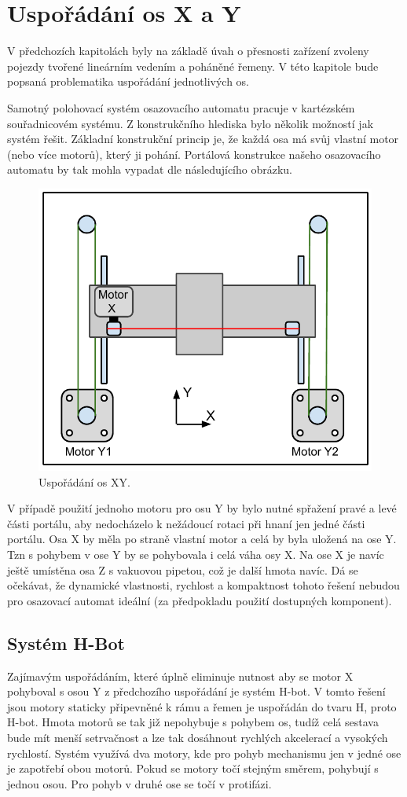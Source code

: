 \section{Uspořádání os X a Y}

V předchozích kapitolách byly na základě úvah o přesnosti zařízení zvoleny pojezdy tvořené lineárním vedením a poháněné řemeny. V této kapitole bude popsaná problematika uspořádání jednotlivých os.

Samotný polohovací systém osazovacího automatu pracuje v kartézském souřadnicovém systému.  Z konstrukčního hlediska bylo několik možností jak systém řešit. Základní konstrukční princip je, že každá osa má svůj vlastní motor (nebo více motorů), který ji pohání. Portálová konstrukce našeho osazovacího automatu by tak mohla vypadat dle následujícího obrázku.

\begin{figure}[H]
  \centering
    \includegraphics[width=0.6\linewidth]{pdf/XY2.pdf}%
    \caption{Uspořádání os XY.}
    \label{fig:XY}
\end{figure}


V případě použití jednoho motoru pro osu Y by bylo nutné spřažení pravé a levé části portálu, aby nedocházelo k nežádoucí rotaci při hnaní jen jedné části portálu. Osa X by měla po straně vlastní motor a celá by byla uložená na ose Y. Tzn s pohybem v ose Y by se pohybovala i celá váha osy X. Na ose X je navíc ještě umístěna osa Z s vakuovou pipetou, což je další hmota navíc. Dá se očekávat, že dynamické vlastnosti, rychlost a kompaktnost tohoto řešení nebudou pro osazovací automat ideální (za předpokladu použití dostupných komponent).





\subsection{Systém H-Bot}
Zajímavým uspořádáním, které úplně eliminuje nutnost aby se motor X pohyboval s osou Y z předchozího uspořádání je systém H-bot.
 V tomto řešení jsou motory staticky připevněné k rámu a řemen je uspořádán do tvaru H, proto H-bot. Hmota motorů se tak již nepohybuje s pohybem os, tudíž celá sestava bude mít menší setrvačnost a lze tak dosáhnout rychlých akcelerací a vysokých rychlostí. Systém využívá dva motory, kde pro pohyb mechanismu jen v jedné ose je zapotřebí obou motorů. Pokud se motory točí stejným směrem, pohybují s jednou osou. Pro pohyb v druhé ose se točí v protifázi.



